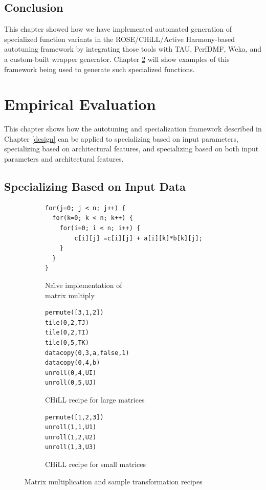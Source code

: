 \documentclass[msthesis,justified,copyright,final,numbers,sort&compress,
gsmodern,amstex,natbib]{uothesis}
\begin{document}
\section{Conclusion}
\label{architecture}

This chapter showed how we have implemented automated generation of specialized function variants in the ROSE/CHiLL/Active Harmony-based autotuning framework by integrating those tools with TAU, PerfDMF, Weka, and a custom-built wrapper generator. Chapter \ref{results} will show examples of this framework being used to generate such specialized functions.


\chapter{Empirical Evaluation}
\label{results}

This chapter shows how the autotuning and specialization framework described in Chapter \ref{design} can be applied to specializing based on input parameters, specializing based on architectural features, and specializing based on both input parameters and architectural features.

\section{Specializing Based on Input Data}
\label {inputdata}

\begin{figure}[btp]
\begin{subfigure}[b]{0.45\textwidth}
\centering
\scriptsize\begin{verbatim}
for(j=0; j < n; j++) {
  for(k=0; k < n; k++) {
    for(i=0; i < n; i++) {
        c[i][j] =c[i][j] + a[i][k]*b[k][j];
    }
  }
}
\end{verbatim}
\caption{Na\"{\i}ve implementation of \\ matrix multiply}
\label{fig:multiply}
\end{subfigure}\hspace{2pt}
\begin{subfigure}[b]{0.3\textwidth}
\centering
\scriptsize\begin{verbatim}
permute([3,1,2])
tile(0,2,TJ)
tile(0,2,TI)
tile(0,5,TK)
datacopy(0,3,a,false,1)
datacopy(0,4,b)
unroll(0,4,UI)
unroll(0,5,UJ)
\end{verbatim}
\caption{\centering CHiLL recipe for large matrices}
\label{fig:large}
\end{subfigure}\hspace{2pt}
\begin{subfigure}[b]{0.2\textwidth}
\centering
\scriptsize\begin{verbatim}
permute([1,2,3])
unroll(1,1,U1)
unroll(1,2,U2)
unroll(1,3,U3)
\end{verbatim}
\caption{\centering CHiLL recipe for small matrices}
\label{fig:small}
\end{subfigure}
\caption{Matrix multiplication and sample transformation recipes}
\label{fig:inputdatat}
\end{figure}
\end{document}
